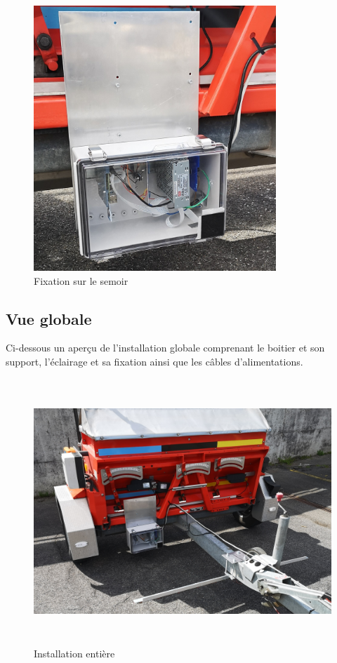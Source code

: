 \begin{figure}[H]
    \centering
    \includegraphics[height=10cm]{assets/figures/boitier_adaptation.jpg}
    \caption{Fixation sur le semoir}
\end{figure}

\subsection{Vue globale}
Ci-dessous un aperçu de l'installation globale comprenant le boitier et son support, l'éclairage et sa fixation ainsi que les câbles d'alimentations.
\begin{figure}[H]
    \centering
    \includegraphics[height=10cm]{assets/figures/installation_globale.jpg}
    \caption{Installation entière}
\end{figure}
